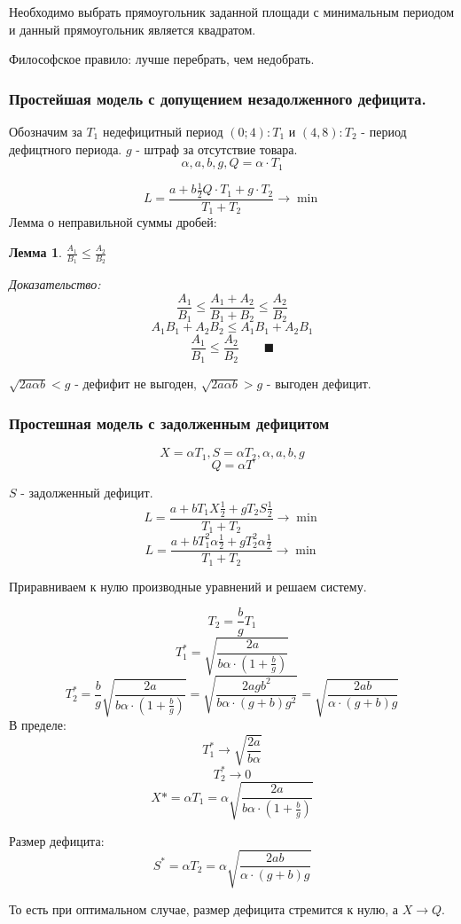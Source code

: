 \documentclass[aps,%
12pt,%
final,%
oneside,
onecolumn,%
musixtex, %
superscriptaddress,%
centertags]{article} %
\theoremstyle{plain}
\newtheorem{lemma}{Лемма}
\begin{document}
Необходимо выбрать прямоугольник заданной площади с минимальным периодом и данный прямоугольник является квадратом.

Философское правило: лучше перебрать, чем недобрать.

\subsubsection{Простейшая модель с допущением незадолженного дефицита.}

\begin{center}
\end{center}

Обозначим за $T_1$ недефицитный период $(0;4): T_1$ и $(4,8):T_2$ - период дефицтного периода. $g$ - штраф за отсутствие товара.
$$\alpha,a,b,g, Q = \alpha \cdot T_1$$

$$L = \frac{a+b\frac{1}{2}Q \cdot T_1+g\cdot T_2}{T_1 + T_2} \to \min$$
Лемма о неправильной суммы дробей:
\begin{lemma}
	$\frac{A_1}{B_1} \leq \frac{A_2}{B_2}$
\end{lemma}
\textit{Доказательство:}
$$\frac{A_1}{B_1} \leq \frac{A_1+A_2}{B_1+B_2} \leq \frac{A_2}{B_2}$$
$$A_1B_1 +A_2B_2 \leq A_1B_1 + A_2B_1 $$
$$\frac{A_1}{B_1} \leq \frac{A_2}{B_2} \qquad \blacksquare$$

$\sqrt{2a\alpha b} < g$ - дефифит не выгоден,
$\sqrt{2a\alpha b} > g$ - выгоден дефицит.

\subsubsection{Простешная модель с задолженным дефицитом}
$$ X = \alpha T_1, S = \alpha T_2, \alpha,a,b,g$$
$$ Q = \alpha T $$

$S $ - задолженный дефицит.
$$L = \frac{a+bT_1X\frac{1}{2} + g T_2 S \frac{1}{2}}{T_1 + T_2} \to \min$$
$$L = \frac{a+bT_1^2\alpha \frac{1}{2} + g T_2^2 \alpha \frac{1}{2}}{T_1 + T_2} \to \min$$

Приравниваем к нулю производные уравнений и решаем систему.

$$T_2 = \frac{b}{g}T_1$$
$$T_1^* = \sqrt{\frac{2a}{b\alpha \cdot (1+\frac{b}{g})}}$$
$$ T_2^* = \frac{b}{g}  \sqrt{\frac{2a}{b\alpha \cdot (1+\frac{b}{g})}} =  \sqrt{\frac{2agb^2}{b\alpha \cdot (g+b) g^2}} =\sqrt{\frac{2ab}{\alpha \cdot (g+b) g}} $$
В пределе:
$$T_1^* \to \sqrt{\frac{2a}{b\alpha }}$$
$$T_2^* \to 0$$
$$X*=\alpha T_1 = \alpha  \sqrt{\frac{2a}{b\alpha \cdot (1+\frac{b}{g})}} $$

Размер дефицита:
$$ S^* = \alpha T_2 = \alpha \sqrt{\frac{2ab}{\alpha \cdot (g+b) g}}$$

То есть при оптимальном случае, размер дефицита стремится к нулю, а $X \to Q$.
\end{document}
